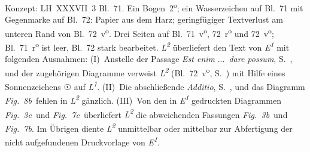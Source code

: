\begin{ledgroupsized}[r]{114mm}
\footnotesize
\pstart \parindent -6mm
%
Konzept: LH~XXXVII~3 Bl.~71.
Ein Bogen~2\textsuperscript{o};
ein Wasserzeichen auf Bl.~71 mit Gegenmarke auf Bl.~72: Papier aus dem Harz;
geringfügiger Textverlust am unteren Rand von Bl.~72~v\textsuperscript{o}.
Drei Seiten auf Bl.~71~v\textsuperscript{o}, 72~r\textsuperscript{o}\! und 72~v\textsuperscript{o};
Bl.~71~r\textsuperscript{o}\! ist leer, Bl.~72 stark bearbeitet.
\textit{L\textsuperscript{2}} überliefert den Text von \textit{E\textsuperscript{1}} %
mit folgenden Ausnahmen:
(I)~Anstelle der Passage \textit{Est enim} \lbrack...\rbrack\ \textit{dare possum}, S.~, und der zugehörigen Diagramme %
verweist \textit{L\textsuperscript{2}} %
(Bl.~72~v\textsuperscript{o}, S.~\pageref{LH_37_03_072r-SonneMonde}) mit Hilfe eines Sonnenzeichens $\astrosun$ auf \textit{L\textsuperscript{1}}.
(II)~Die abschließende \textit{Additio}, S.~, und das Diagramm \lbrack\textit{Fig.~8b}\rbrack\ fehlen in \textit{L\textsuperscript{2}} gänzlich.
(III)~Von den in \textit{E\textsuperscript{1}} gedruckten Diagrammen \lbrack\textit{Fig.~3c}\rbrack\ und \lbrack\textit{Fig.~7c}\rbrack\ überliefert \textit{L\textsuperscript{2}} die abweichenden Fassungen \lbrack\textit{Fig.~3b}\rbrack\ und \lbrack\textit{Fig.~7b}\rbrack.
Im Übrigen diente %
\textit{L\textsuperscript{2}} unmittelbar oder mittelbar zur Abfertigung der nicht aufgefundenen Druckvorlage von \textit{E\textsuperscript{1}}.
\pend
\end{ledgroupsized}
%
